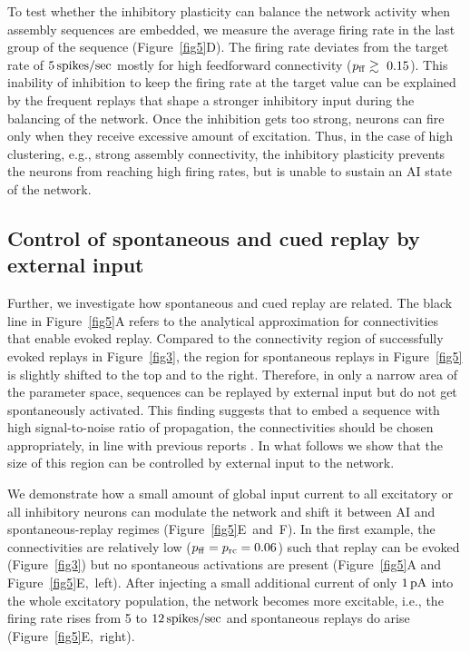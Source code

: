     To test whether the inhibitory plasticity can balance the network activity
    when assembly sequences are embedded, we measure the average firing rate in
    the last group of the sequence (Figure~\ref{fig5}D). The firing rate deviates
    from the target rate of $5 \, \rm spikes/sec$ mostly for high feedforward
    connectivity ($p_{\rm ff} \gtrsim~0.15$). This inability of inhibition to
    keep the firing rate at the target value can be explained by the frequent
    replays that shape a stronger inhibitory input during the balancing of the
    network. Once the inhibition gets too strong, neurons can fire only when
    they receive excessive amount of excitation. Thus, in the case of high
    clustering, e.g., strong assembly connectivity, the inhibitory plasticity
    prevents the neurons from reaching high firing rates, but is unable to
    sustain an AI state of the network.

  \subsection{Control of spontaneous and cued replay by external input}
    Further, we investigate how spontaneous and cued replay are related. The
    black line in Figure~\ref{fig5}A refers to the analytical approximation for
    connectivities that enable evoked replay. Compared to the connectivity
    region of successfully evoked replays in Figure~\ref{fig3}, the region for
    spontaneous replays in Figure~\ref{fig5} is slightly shifted to the top and to
    the right. Therefore, in only a narrow area of the parameter space,
    sequences can be replayed by external input but do not get spontaneously
    activated. This finding suggests that to embed a sequence with high
    signal-to-noise ratio of propagation, the connectivities should be chosen
    appropriately, in line with previous reports \citep{Kumar2010}. In what
    follows we show that the size of this region can be controlled by external
    input to the network.

    We demonstrate how a small amount of global input current to all excitatory
    or all inhibitory neurons can modulate the network and shift it between AI
    and spontaneous-replay regimes (Figure~\ref{fig5}E~and~F). In the first
    example, the connectivities are relatively low ($p_{\rm ff}=p_{\rm rc} =
    0.06$) such that replay can be evoked (Figure~\ref{fig3}) but no spontaneous
    activations are present (Figure~\ref{fig5}A and Figure~\ref{fig5}E,~left). After
    injecting a small additional current of only $1 \, \rm pA$ into the whole
    excitatory population, the network becomes more excitable, i.e., the firing
    rate rises from 5 to $12 \, \rm spikes/sec$ and spontaneous replays do
    arise (Figure~\ref{fig5}E,~right).

